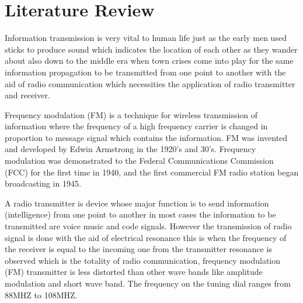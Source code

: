 \thispagestyle{plain}

\chapter{Literature Review}
\noindent
\begin{flushleft}
\par
Information transmission is very vital to human life just as the early men used sticks to produce sound which indicates the location of each other as they wander about also down to the middle era when town crises come into play for the same information propagation to be transmitted from one point to another with the aid of radio communication which necessities the application of radio transmitter and receiver. \par

Frequency modulation (FM) is a technique for wireless transmission of information where the frequency of a high frequency carrier is changed in proportion to message signal which contains the information. FM was invented and developed by Edwin Armstrong in the 1920’s and 30’s. Frequency modulation was demonstrated to the Federal Communications Commission (FCC) for the first time in 1940, and the first commercial FM radio station began broadcasting in 1945. \par

A radio transmitter is device whose major function is to send information (intelligence) from one point to another in most cases the information to be transmitted are voice music and code signals. However the transmission of radio signal is done with the aid of electrical resonance this is when the frequency of the receiver is equal to the incoming one from the transmitter resonance is observed which is the totality of radio communication, frequency modulation (FM) transmitter is less distorted than other wave bands like amplitude modulation and short wave band. The frequency on the tuning dial ranges from 88MHZ to 108MHZ.
\end{flushleft}
